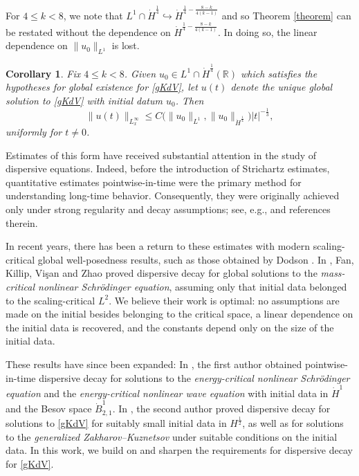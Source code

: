 \documentclass[10pt, reqno]{amsart}
\numberwithin{equation}{section}
\newcommand{\R}{\mathbb{R}}
\newtheorem{corollary}[theorem]{Corollary}
\theoremstyle{definition}
\theoremstyle{remark}
\begin{document}
For $4 \leq k < 8$, we note that $L^1 \cap \dot{H}^{\frac{1}{4}} \hookrightarrow \dot{H}^{\frac{1}{4} - \frac{8-k}{4(k-1)}}$ and so Theorem \ref{theorem} can be restated without the dependence on $\dot{H}^{\frac{1}{4} - \frac{8-k}{4(k-1)}}$. In doing so, the linear dependence on $\|u_0\|_{L^1}$ is lost.
\begin{corollary}
    Fix $4 \leq k < 8$. Given $u_0 \in L^{1}\cap\dot{H}^{\frac{1}{4}}(\R)$ which satisfies the hypotheses for global existence for \eqref{gKdV}, let $u(t)$ denote the unique global solution to \eqref{gKdV} with initial datum $u_0$. Then
    \begin{equation*}
        \|u(t)\|_{L_x^\infty} \leq C\big(\|u_0\|_{L^1}, \|u_0\|_{\dot{H}^{\frac{1}{4}}}\big) |t|^{-\frac{1}{3}},
    \end{equation*}
    uniformly for $t \neq 0$.
\end{corollary}

Estimates of this form have received substantial attention in the study of dispersive equations. Indeed, before the introduction of Strichartz estimates, quantitative estimates pointwise-in-time were the primary method for understanding long-time behavior. Consequently, they were originally achieved only under strong regularity and decay assumptions; see, e.g., \cite{LinStr78, Klai85, KlaiPon83, MorStr72} and references therein.

In recent years, there has been a return to these estimates with modern scaling-critical global well-posedness results, such as those obtained by Dodson \cite{Dodson2017}. 
In \cite{FKVZ24}, Fan, Killip, Vi\c{s}an and Zhao proved dispersive decay for global solutions to the {\em mass-critical nonlinear Schr\"odinger equation}, assuming only that initial data belonged to the scaling-critical $L^2$.
We believe their work is optimal: no assumptions are made on the initial besides belonging to the critical space, a linear dependence on the initial data is recovered, and the constants depend only on the size of the initial data.

These results have since been expanded: In \cite{Kowal24, Kowal25}, the first author obtained pointwise-in-time dispersive decay for solutions to the {\em energy-critical nonlinear Schr\"odinger equation} and the {\em energy-critical nonlinear wave equation} with initial data in $\dot{H}^1$ and the Besov space $\dot{B}^1_{2,1}$. In \cite{Shan24}, the second author proved dispersive decay for solutions to \eqref{gKdV} for suitably small initial data in $H^{\frac{1}{2}}$, as well as for solutions to the {\em generalized Zakharov--Kuznetsov} under suitable conditions on the initial data. In this work, we build on \cite{Shan24} and sharpen the requirements for dispersive decay for \eqref{gKdV}.
\end{document}
